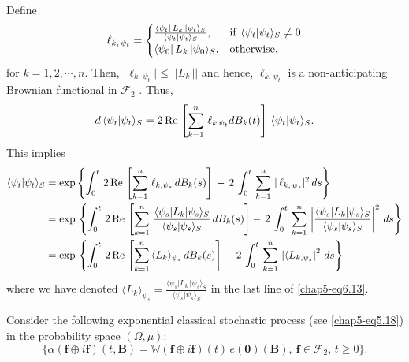 Define 
\begin{eqnarray}
\ell_{k,\,\psi_t}=
		\begin{cases}
		\frac{\langle \psi_t\vert\, L_k\,\vert\psi_t\rangle_S}{\langle \psi_t\vert \psi_t\rangle_S}, &   {\rm if}\ \langle \psi_t\vert \psi_t\rangle_S\neq 0 \\
		\langle \psi_0\vert\, L_k\,\vert\psi_0\rangle_S, &  {\rm otherwise,}
		\end{cases}\label{chap5-eq6.11}
\end{eqnarray}
for $k=1,2,\cdots , n$.  Then, $\vert  \ell_{k,\,\psi_t} \vert \leq \vert\vert L_k\,\vert\vert$ and hence, $\ell_{k,\, \psi_t}$ is a non-anticipating Brownian functional in  $\mathcal{F}_2$ . Thus,    
\begin{eqnarray} 
d\, \langle \psi_t\vert \psi_t\rangle_S= 2\, {\rm Re}\, \left[\sum_{k=1}^{n}\, \ell_{k\, \psi_t} 
dB_k(t)\right]\, \langle \psi_t\vert \psi_t\rangle_S.  \label{chap5-eq6.12}
\end{eqnarray}   
This implies 
{\fontsize{8pt}{10pt}\selectfont 
\begin{align}
	\langle \psi_t\vert \psi_t\rangle_S &=\exp \left\{\int_{0}^{t}\, 2\, {\rm Re}\, \left[ \sum_{k=1}^{n}\,\ell_{k,\psi_s}\, dB_{k}(s)\right]\, -\, 2\,\int_{0}^{t}\, \sum_{k=1}^n\, \vert\,\ell_{k,\,\psi_s}\vert^2\, ds\right\}\nonumber \\ 
	&= {\exp}\,\left\{\int_{0}^{t}\, 2\, {\rm Re}\, \left[ \sum_{k=1}^n\, \frac{\langle \psi_s\vert L_k\vert\psi_s\rangle_S}{\langle \psi_s\vert \psi_s\rangle_S}\, 
	dB_k(s)\right] -\, 2\,\int_{0}^{t}\, \sum_{k=1}^n\, \left|\frac{\langle \psi_s\vert  L_k\vert \psi_s\rangle_S}{\langle \psi_s\vert \psi_s\rangle_S}\right|^2\, ds\right\}\nonumber \\  
	&=  {\exp}\,\left\{\int_{0}^{t}\,  2\,{\rm Re}\, \left[\sum_{k=1}^n\,\langle L_k\rangle_{\psi_s}\, 
	dB_k(s)\right]   -\, 2\,\int_{0}^{t}\, \sum_{k=1}^n\,\left\vert \langle L_{k,\psi_s} \right\vert^2\, ds 
	\right\} \label{chap5-eq6.13}
\end{align}}\relax
where we have denoted $\langle L_k\rangle_{\psi_s}=\frac{\langle \psi_s\vert L_{k}\,\vert\psi_s\rangle_S}
{\langle \psi_s\vert \psi_s\rangle_S}$ in the last line of \eqref{chap5-eq6.13}. 

Consider the following exponential classical stochastic process (see \eqref{chap5-eq5.18}) in the probability space $(\Omega, \mu)$:     
\begin{equation}
\{\alpha(\mathbf{f}\oplus i\mathbf{f})(t,\mathbf{B})=\mathbb{W}(\mathbf{f}\oplus i\mathbf{f})(t)\, e(\mathbf{0})(\mathbf{B}),\ \mathbf{f}\in\mathcal{F}_2,\, t\geq 0\}. \label{chap5-eq6.14}
\end{equation}

